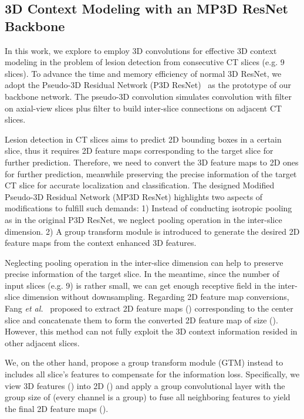 \documentclass[runningheads]{llncs}
\begin{document}
\subsection{3D Context Modeling with an MP3D ResNet Backbone}

In this work, we explore to employ 3D convolutions for effective 3D context modeling in the problem of lesion detection from consecutive CT slices (e.g. 9 slices). To advance the time and memory efficiency of normal 3D ResNet, we adopt the Pseudo-3D Residual Network (P3D ResNet)~\cite{P3D} as the prototype of our backbone network.
The pseudo-3D convolution simulates  convolution with  filter on axial-view slices plus  filter to build inter-slice connections on adjacent CT slices. 


Lesion detection in CT slices aims to predict 2D bounding boxes in a certain slice, thus it requires 2D feature maps corresponding to the target slice for further prediction. 
Therefore, we need to convert the 3D feature maps to 2D ones for further prediction, meanwhile preserving the precise information of the target CT slice for accurate localization and classification. 
The designed Modified Pseudo-3D Residual Network (MP3D ResNet) highlights two aspects of modifications to fulfill such demands:
1) Instead of conducting isotropic pooling as in the original P3D ResNet, we neglect pooling operation in the inter-slice dimension. 
2) A group transform module is introduced to generate the desired 2D feature maps from the context enhanced 3D features.

Neglecting pooling operation in the inter-slice dimension can help to preserve precise information of the target slice. In the meantime, since the number of input slices (e.g. 9) is rather small, we can get enough receptive field in the inter-slice dimension without downsampling. 
Regarding 2D feature map conversions, Fang \textit{et al.}~\cite{PFN} proposed to extract  2D feature maps () corresponding to the center slice and concatenate them to form the converted 2D feature map of size ().
However, this method can not fully exploit the 3D context information resided in other adjacent slices.

We, on the other hand, propose a group transform module (GTM) instead to includes all slice's features to compensate for the information loss.
Specifically, we view 3D features () into 2D () and apply a group convolutional layer with the group size of  (every  channel is a group) to fuse all neighboring features to yield the final 2D feature maps (). 
\end{document}
